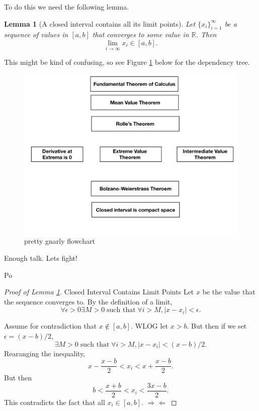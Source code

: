 \documentclass{article}[11pt]
\DeclareMathOperator{\st}{\text{ such that }}
\newcommand{\contr}[0]{ $\Rightarrow\!\Leftarrow$ }
\newtheorem{lemma}{Lemma}
\begin{document}
To do this we need the following lemma.
\begin{lemma}[A closed interval contains all its limit points]
	\label{lem:intervalContainsLimitPts}
	Let $\{x_i\}_{i=1}^\infty$ be a sequence of values in $[a,b]$ that converges to some value in $\mathbb{R}$. 
	Then $$\lim_{i\to \infty} x_i \in [a, b].$$
\end{lemma}

This might be kind of confusing, so see Figure \ref{fig:flowchart} below for the dependency tree.
\begin{center}
	\begin{figure}[h]
		\label{fig:flowchart}
	\centering
	\includegraphics[width=\linewidth]{ftcFlowChart/ftcFlowChart.png}
	\caption{pretty gnarly flowchart}
\end{figure}
\end{center}

\epigraph{Enough talk. Lets fight!}{Po}

\begin{proof}[Proof of Lemma \ref{lem:intervalContainsLimitPts}]{Closed Interval Contains Limit Points}
	Let $x$ be the value that the sequence converges to. 
	By the definition of a limit, 
	$$\forall \epsilon > 0 \exists M>0 \st \forall i>M, |x-x_i|< \epsilon.$$

	Assume for contradiction that $x\not\in [a,b]$. 
	WLOG let $x>b$. But then if we set $\epsilon = (x-b)/2$,
	$$\exists M>0 \st \forall i>M, |x-x_i| < (x-b)/2.$$
	Rearanging the inequality, 
	$$ x-\frac{x-b}{2}< x_i < x+\frac{x-b}{2}.$$
	But then
	$$ b < \frac{x+b}{2}< x_i < \frac{3x-b}{2}.$$
	This contradicts the fact that all $x_i \in [a, b].$\contr
\end{proof}
\end{document}
